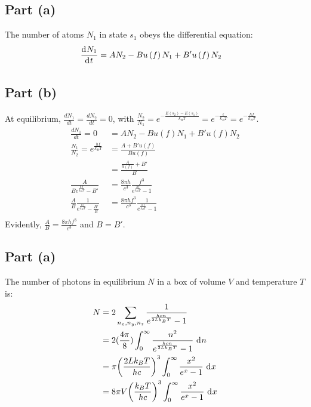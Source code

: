 \documentclass{article}
\begin{document}
\clearpage

\subsection*{Part (a)}
The number of atoms $N_1$ in state $s_1$ obeys the differential equation:
\begin{equation}
    \begin{split}
        \deriv{N_1}{t} & = AN_2 - Bu\left(f\right)N_1 + B'u\left(f\right)N_2
    \end{split}
\end{equation}
\subsection*{Part (b)}
At equilibrium, $\frac{dN_1}{dt} = \frac{dN_2}{dt} = 0$, with $\frac{N_2}{N_1} = e^{-\frac{E(s_2) - E(s_1)}{k_BT}} = e^{-\frac{\epsilon}{k_BT}} = e^{-\frac{hf}{k_BT}}$. 
    \begin{equation}
        \begin{split}
            \frac{dN_1}{dt} = 0 & = AN_2 - Bu\left(f\right)N_1 + B'u\left(f\right)N_2 \\
            \frac{N_1}{N_2} = e^{\frac{hf}{k_BT}} & = \frac{A + B'u\left(f\right)}{Bu\left(f\right)} \\
            & = \frac{\frac{A}{u\left(f\right)} + B'}{B} \\
            \frac{A}{Be^{\frac{hf}{k_BT}} - B'} & = \frac{8\pi h}{c^3}\frac{f^3}{e^{\frac{hf}{k_BT}} - 1} \\    
            \frac{A}{B}\frac{1}{e^{\frac{hf}{k_BT}} - \frac{B'}{B}} & = \frac{8\pi hf^3}{c^3}\frac{1}{e^{\frac{hf}{k_BT}} - 1} \\
        \end{split}
    \end{equation}
    Evidently, $\frac{A}{B} = \frac{8\pi hf^3}{c^3}$ and $B = B'$.

\clearpage

\subsection*{Part (a)}
The number of photons in equilibrium $N$ in a box of volume $V$ and temperature $T$ is:
\begin{equation}
    \begin{split}
        N & = 2\sum_{n_x,n_y,n_z} \frac{1}{e^{\frac{hcn}{2Lk_BT}} - 1} \\
        & = 2(\frac{4\pi}{8})\int_0^{\infty} \frac{n^2}{e^{\frac{hcn}{2Lk_BT}} - 1} \, \diff{n} \\
        & = \pi{\left(\frac{2Lk_BT}{hc}\right)}^3\int_0^{\infty} \frac{x^2}{e^x - 1} \, \diff{x} \\
        & = 8\pi V{\left(\frac{k_BT}{hc}\right)}^3\int_0^{\infty} \frac{x^2}{e^x - 1} \, \diff{x} \\
    \end{split}
\end{equation}
\end{document}
